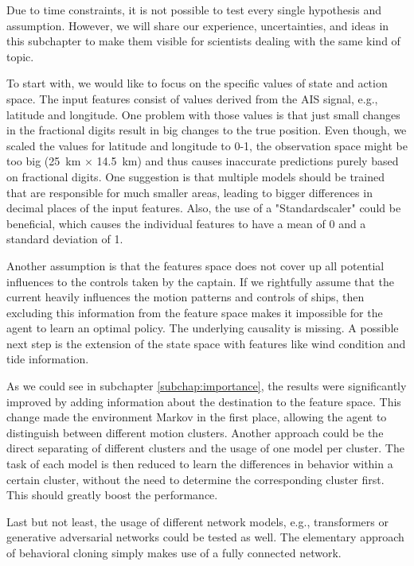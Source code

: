 Due to time constraints, it is not possible to test every single hypothesis and assumption. However, we will share our experience, uncertainties, and ideas in this subchapter to make them visible for scientists dealing with the same kind of topic.
\par
To start with, we would like to focus on the specific values of state and action space. The input features consist of values derived from the AIS signal, e.g., latitude and longitude. One problem with those values is that just small changes in the fractional digits result in big changes to the true position. Even though, we scaled the values for latitude and longitude to 0-1, the observation space might be too big (25 km $\times$ 14.5 km) and thus causes inaccurate predictions purely based on fractional digits. One suggestion is that multiple models should be trained that are responsible for much smaller areas, leading to bigger differences in decimal places of the input features. Also, the use of a "Standardscaler" could be beneficial, which causes the individual features to have a mean of 0 and a standard deviation of 1.
\par
Another assumption is that the features space does not cover up all potential influences to the controls taken by the captain. If we rightfully assume that the current heavily influences the motion patterns and controls of ships, then excluding this information from the feature space makes it impossible for the agent to learn an optimal policy. The underlying causality is missing. A possible next step is the extension of the state space with features like wind condition and tide information.
\par
As we could see in subchapter \ref{subchap:importance}, the results were significantly improved by adding information about the destination to the feature space. This change made the environment Markov in the first place, allowing the agent to distinguish between different motion clusters. Another approach could be the direct separating of different clusters and the usage of one model per cluster. The task of each model is then reduced to learn the differences in behavior within a certain cluster, without the need to determine the corresponding cluster first. This should greatly boost the performance.
\par
Last but not least, the usage of different network models, e.g., transformers or generative adversarial networks could be tested as well. The elementary approach of behavioral cloning simply makes use of a fully connected network.